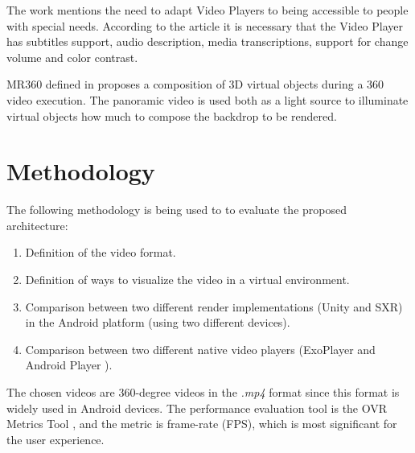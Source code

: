 \documentclass[runningheads]{llncs}
\begin{document}
The work \cite{wild2018inaccessibility} mentions the need to adapt Video Players to being accessible to people with special needs. According to the article it is necessary that the Video Player has subtitles support, audio description, media transcriptions, support for change volume and color contrast.

MR360 defined in \cite{rhee2017mr360} proposes a composition of 3D virtual objects during a 360 video execution. The panoramic video is used both as a light source to illuminate virtual objects how much to compose the backdrop to be rendered.


\section{Methodology} \label{methodology}

The following methodology is being used to to evaluate the proposed architecture:

\begin{enumerate}
    \item Definition of the video format.
    \item Definition of ways to visualize the video in a virtual environment.
    \item Comparison between two different render implementations (Unity and SXR) in the Android platform (using two different devices).
    \item Comparison between two different native video players (ExoPlayer \cite{Exo} and Android Player \cite{AndroidVideoPlayer}).
\end{enumerate}

The chosen videos are 360-degree videos in the \textit{.mp4} format since this format is widely used in Android devices. The performance evaluation tool is the OVR Metrics Tool \cite{ovrmetrictool}, and the metric is frame-rate (FPS), which is most significant for the user experience.


\end{document}
